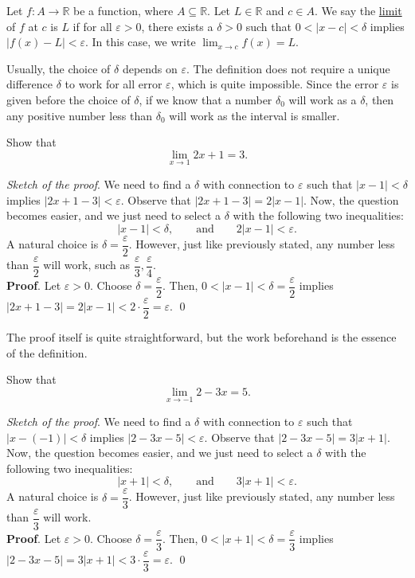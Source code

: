 \documentclass[11pt]{book}
\theoremstyle{break}
\theoremstyle{no_label}
\newcommand{\bbR}{\mathbb{R}}
\numberwithin{equation}{section}
\begin{document}
\begin{definition}[Limit]
    Let $f:A\to\bbR$ be a function, where $A\subseteq\bbR$. Let $L\in\bbR$ and $c\in A$. We say the \underline{limit} of $f$ at $c$ is $L$ if for all $\varepsilon>0$, there exists a $\delta>0$ such that $0<|x-c|<\delta$ implies $|f(x)-L|<\varepsilon$. In this case, we write $\displaystyle\lim_{x\to c}f(x)=L$.
\end{definition}

\begin{remark}
    Usually, the choice of $\delta$ depends on $\varepsilon$. The definition does not require a unique difference $\delta$ to work for all error $\varepsilon$, which is quite impossible. Since the error $\varepsilon$ is given before the choice of $\delta$, if we know that a number $\delta_0$ will work as a $\delta$, then any positive number less than $\delta_0$ will work as the interval is smaller.
\end{remark}

\begin{example}
    Show that $$\lim_{x\to 1}2x+1=3.$$
\end{example}
\textit{Sketch of the proof}. We need to find a $\delta$ with connection to $\varepsilon$ such that $|x-1|<\delta$ implies $|2x+1-3|<\varepsilon$. Observe that $|2x+1-3|=2|x-1|$. Now, the question becomes easier, and we just need to select a $\delta$ with the following two inequalities: 
\begin{equation*}
    |x-1|<\delta, \qquad\text{and}\qquad 2|x-1|<\varepsilon.
\end{equation*}
A natural choice is $\delta=\dfrac{\varepsilon}{2}$. However, just like previously stated, any number less than $\dfrac{\varepsilon}{2}$ will work, such as $\dfrac{\varepsilon}{3}, \dfrac{\varepsilon}{4}$.\\
\textbf{Proof}. Let $\varepsilon>0$. Choose $\delta=\dfrac{\varepsilon}{2}$. Then, $0<|x-1|<\delta=\dfrac{\varepsilon}{2}$ implies $|2x+1-3|=2|x-1|<2\cdot\dfrac{\varepsilon}{2}=\varepsilon$. \qed

The proof itself is quite straightforward, but the work beforehand is the essence of the definition.

\begin{example}
    Show that $$\lim_{x\to -1}2-3x=5.$$
\end{example}
\textit{Sketch of the proof}. We need to find a $\delta$ with connection to $\varepsilon$ such that $|x-(-1)|<\delta$ implies $|2-3x-5|<\varepsilon$. Observe that $|2-3x-5|=3|x+1|$. Now, the question becomes easier, and we just need to select a $\delta$ with the following two inequalities: 
\begin{equation*}
    |x+1|<\delta, \qquad\text{and}\qquad 3|x+1|<\varepsilon.
\end{equation*}
A natural choice is $\delta=\dfrac{\varepsilon}{3}$. However, just like previously stated, any number less than $\dfrac{\varepsilon}{3}$ will work.\\
\textbf{Proof}. Let $\varepsilon>0$. Choose $\delta=\dfrac{\varepsilon}{3}$. Then, $0<|x+1|<\delta=\dfrac{\varepsilon}{3}$ implies $|2-3x-5|=3|x+1|<3\cdot\dfrac{\varepsilon}{3}=\varepsilon$. \qed
\end{document}
